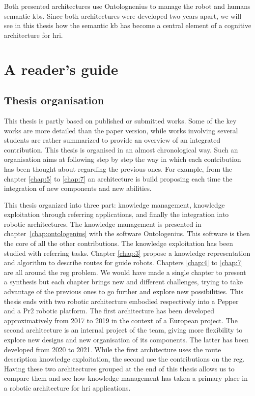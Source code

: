 Both presented architectures use Ontolognenius to manage the robot and humans semantic \acrshort{kb}s. Since both architectures were developed two years apart, we will see in this thesis how the semantic \acrlong{kb} has become a central element of a cognitive architecture for \acrlong{hri}.

\section{A reader's guide}

\subsection*{Thesis organisation}

This thesis is partly based on published or submitted works. Some of the key works are more detailed than the paper version, while works involving several students are rather summarized to provide an overview of an integrated contribution.
This thesis is organised in an almost chronological way. Such an organisation aims at following step by step the way in which each contribution has been thought about regarding the previous ones. For example, from the chapter \ref{chap:5} to \ref{chap:7} an architecture is build proposing each time the integration of new components and new abilities. 

This thesis organized into three part: knowledge management, knowledge exploitation through referring applications, and finally the integration into robotic architectures. The knowledge management is presented in chapter~\ref{chap:ontologenius} with the software Ontologenius. This software is then the core of all the other contributions. The knowledge exploitation has been studied with referring tasks. Chapter \ref{chap:3} propose a knowledge representation and algorithm to describe routes for guide robots. Chapters \ref{chap:4} to \ref{chap:7} are all around the \acrlong{reg} problem. We would have made a single chapter to present a synthesis but each chapter brings new and different challenges, trying to take advantage of the previous ones to go further and explore new possibilities. This thesis ends with two robotic architecture embodied respectively into a Pepper and a Pr2 robotic platform. The first architecture has been developed approximatively from 2017 to 2019 in the context of a European project. The second architecture is an internal project of the team, giving more flexibility to explore new designs and new organisation of its components. The latter has been developed from 2020 to 2021. While the first architecture uses the route description knowledge exploitation, the second use the contributions on the \acrlong{reg}. Having these two architectures grouped at the end of this thesis allows us to compare them and see how knowledge management has taken a primary place in a robotic architecture for \acrlong{hri} applications.

